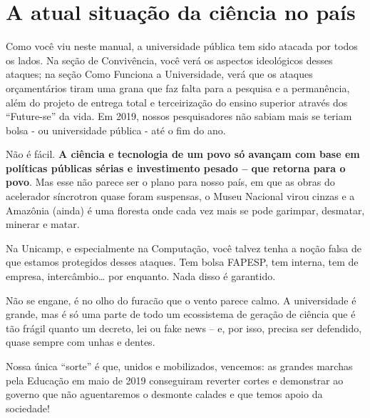 \section{A atual situação da ciência no país}

Como você viu neste manual, a universidade pública tem sido atacada por todos  os lados. Na seção de Convivência, você verá os aspectos ideológicos desses ataques; na  seção Como Funciona a Universidade, verá que os ataques orçamentários tiram uma grana  que faz falta para a pesquisa e a permanência, além do projeto de entrega total e  terceirização do ensino superior através dos “Future-se” da vida. Em 2019, nossos  pesquisadores não sabiam mais se teriam bolsa - ou universidade pública - até o fim do  ano. 

Não é fácil. \textbf{A ciência e tecnologia de um povo só avançam com base em políticas  públicas sérias e investimento pesado – que retorna para o povo}. Mas esse não parece  ser o plano para nosso país, em que as obras do acelerador síncrotron quase foram  suspensas, o Museu Nacional virou cinzas e a Amazônia (ainda) é uma floresta onde  cada vez mais se pode garimpar, desmatar, minerar e matar. 

Na Unicamp, e especialmente na Computação, você talvez tenha a noção falsa de  que estamos protegidos desses ataques. Tem bolsa FAPESP, tem interna, tem de empresa,  intercâmbio… por enquanto. Nada disso é garantido. 

Não se engane, é no olho do furacão que o vento parece calmo. A universidade é  grande, mas é só uma parte de todo um ecossistema de geração de ciência que é tão  frágil quanto um decreto, lei ou fake news – e, por isso, precisa ser defendido, quase  sempre com unhas e dentes. 

Nossa única “sorte” é que, unidos e mobilizados, vencemos: as grandes marchas  pela Educação em maio de 2019 conseguiram reverter cortes e demonstrar ao governo  que não aguentaremos o desmonte calades e que temos apoio da sociedade! 
